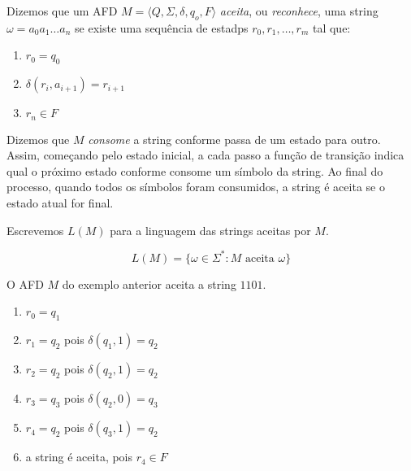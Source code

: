 Dizemos que um AFD $M = \langle Q, \Sigma, \delta, q_o, F \rangle$ {\em aceita}, ou {\em reconhece}, uma string $\omega = a_0 a_1 \dots a_n$ se existe uma sequência de estadps $r_0, r_1, \dots, r_m$ tal que:
\begin{enumerate}
\item $r_0 = q_0$
\item $\delta(r_i, a_{i+1}) = r_{i+1}$
\item $r_n \in F$
\end{enumerate}

Dizemos que $M$ {\em consome} a string conforme passa de um estado para outro.
Assim, começando pelo estado inicial, a cada passo a função de transição indica qual o próximo estado conforme consome um símbolo da string.
Ao final do processo, quando todos os símbolos foram consumidos, a string é aceita se o estado atual for final.

Escrevemos $L(M)$ para a linguagem das strings aceitas por $M$.

\begin{displaymath}
  L(M) = \{\omega \in \Sigma^* : M \textrm{ aceita } \omega\}
\end{displaymath}


\begin{example}
  O AFD $M$ do exemplo anterior aceita a string $1101$.
\begin{enumerate}
\item $r_0 = q_1$
\item $r_1 = q_2$ pois $\delta(q_1, 1) = q_2$
\item $r_2 = q_2$ pois $\delta(q_2, 1) = q_2$
\item $r_3 = q_3$ pois $\delta(q_2, 0) = q_3$
\item $r_4 = q_2$ pois $\delta(q_3, 1) = q_2$
\item a string é aceita, pois $r_4 \in F$
\end{enumerate}
\end{example}

